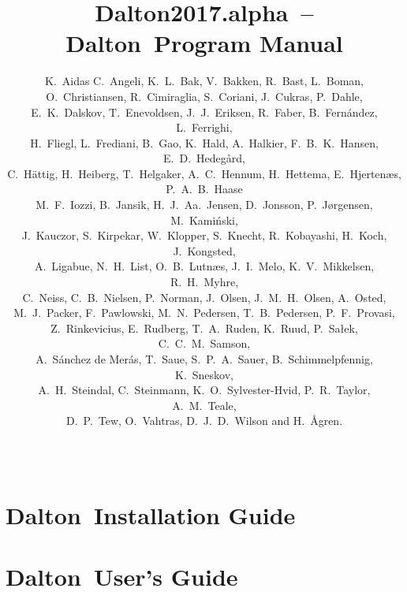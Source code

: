 \documentclass[11pt]{report}
\newcommand{\latestrelease}{Dalton2017.alpha}
\newcommand{\dalton}{{\sc Dalton}}
\begin{document}
\nobibliography*
%
%
\baselineskip=15pt
%
\title{\latestrelease\ -- \dalton\ Program Manual}

%
\author{
K.~Aidas
C.~Angeli,
K.~L.~Bak,
V.~Bakken,
R.~Bast,
L.~Boman,\\
O.~Christiansen,
R.~Cimiraglia,
S.~Coriani,
J.~Cukras,
P.~Dahle,\\
E.~K.~Dalskov,
T.~Enevoldsen,
J.~J.~Eriksen,
R.~Faber,
B.~Fern\'{a}ndez,
L.~Ferrighi,\\
H.~Fliegl,
L.~Frediani,
B.~Gao,
K.~Hald,
A.~Halkier,
F.~B.~K.~Hansen,
E.~D.~Hedeg\aa{}rd,\\
C.~H{\"a}ttig,
H.~Heiberg,
T.~Helgaker,
A.~C.~Hennum,
H.~Hettema,
E.~Hjerten\ae{}s,
P.~A.~B.~Haase\\
M.~F.~Iozzi,
B.~Jansik,
H.~J.~Aa.~Jensen,
D.~Jonsson,
P.~J{\o}rgensen,
M.~Kami{\'n}ski,\\
J.~Kauczor,
S.~Kirpekar,
W.~Klopper,
S.~Knecht,
R.~Kobayashi,
H.~Koch,
J.~Kongsted,\\
A.~Ligabue,
N.~H.~List,
O.~B.~Lutn\ae{}s,
J.~I.~Melo,
K.~V.~Mikkelsen,
R.~H.~Myhre,\\
C.~Neiss,
C.~B.~Nielsen,
P.~Norman,
J.~Olsen,
J.~M.~H.~Olsen,
A.~Osted,\\
M.~J.~Packer,
F.~Pawlowski,
M.~N.~Pedersen,
T.~B.~Pedersen,
P.~F.~Provasi,\\
Z.~Rinkevicius,
E.~Rudberg,
T.~A.~Ruden,
K.~Ruud,
P.~Sa\l{}ek,
C.~C.~M.~Samson,\\
A.~S\'{a}nchez de Mer\'{a}s,
T.~Saue,
S.~P.~A.~Sauer,
B.~Schimmelpfennig,
K.~Sneskov,\\
A.~H.~Steindal,
C.~Steinmann,
K.~O.~Sylvester-Hvid,
P.~R.~Taylor,
A.~M.~Teale,\\
D.~P.~Tew,
O.~Vahtras,
D.~J.~D.~Wilson
and H.~{\AA}gren.
}
%
\date{\mbox{\ }}
%
\maketitle
%


%
\part{\dalton\ Installation Guide}


\part{\dalton\ User's Guide}




















\end{document}
